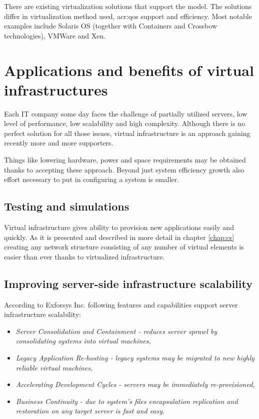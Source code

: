 \documentclass[11pt]{book}
\begin{document}
        There are existing virtualization solutions that support the model. The solutions differ in virtualization
        method used, \gls{acr:qos} support and efficiency. Most notable examples include Solaris OS (together with
        Containers and Crossbow technologies), VMWare and Xen.  %


    \section{Applications and benefits of virtual infrastructures}
    \label{sec:ctx:infra}

      Each IT company some day faces the challenge of partially utilized servers, low level of performance, low
      scalability and high complexity. Although there is no perfect solution for all those issues, virtual
      infrastructure is an approach gaining recently more and more supporters.  

      Things like lowering hardware, power and space requirements may be obtained thanks to accepting these approach.
      Beyond just system efficiency growth also effort necessary to put in configuring a system is smaller. 


      \subsection{Testing and simulations}

        Virtual infrastructure gives ability to provision new applications easily and quickly. As it is presented and
        described in more detail in chapter \ref{chap:cs} creating any network structure consisting of any number of
        virtual elements is easier than ever thanks to virtualized infrastructure. 


      \subsection{Improving server-side infrastructure scalability}

        According to Exforsys Inc. following features and capabilities support server infrastructure scalability:
	
	\begin{itemize}
		\item \textit{Server Consolidation and Containment  - reduces  server sprawl by 
			consolidating systems into virtual machines,}

		\item \textit{Legacy Application Re-hosting - legacy systems may be migrated to new highly reliable virtual machines,}

		\item \textit{Accelerating Development Cycles - servers may be immediately re-provisioned,}

		\item \textit{Business Continuity - due to system's files encapsulation replication 
			and restoration on any target server is fast and easy. \cite{vib}}

	\end{itemize}
\end{document}
